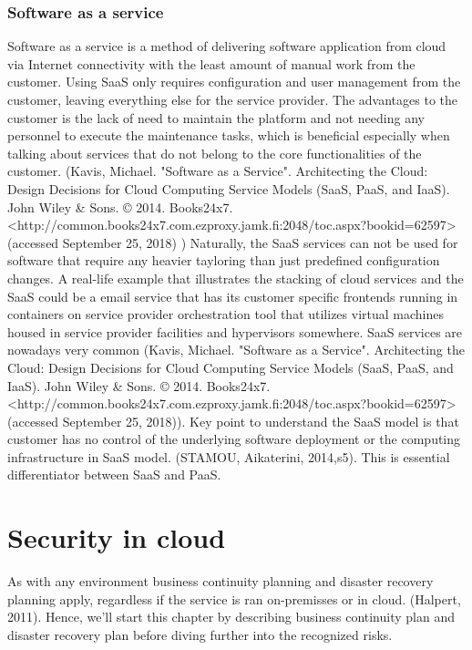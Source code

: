 \documentclass{article}
\begin{document}
\subsubsection{Software as a service}
Software as a service is a method of delivering software application from cloud via Internet connectivity with the least amount of manual work from the customer. Using SaaS only requires configuration and user management from the customer, leaving everything else for the service provider. The advantages to the customer is the lack of need to maintain the platform and not needing any personnel to execute the maintenance tasks, which is beneficial especially when talking about services that do not belong to the core functionalities of the customer. (Kavis, Michael. "Software as a Service". Architecting the Cloud: Design Decisions for Cloud Computing Service Models (SaaS, PaaS, and IaaS). John Wiley \& Sons. © 2014. Books24x7. <http://common.books24x7.com.ezproxy.jamk.fi:2048/toc.aspx?bookid=62597> (accessed September 25, 2018) ) Naturally, the SaaS services can not be used for software that require any heavier tayloring than just predefined configuration changes.
A real-life example that illustrates the stacking of cloud services and the SaaS could be a email service that has its customer specific frontends running in containers on service provider orchestration tool that utilizes virtual machines housed in service provider facilities and hypervisors somewhere. SaaS services are nowadays very common (Kavis, Michael. "Software as a Service". Architecting the Cloud: Design Decisions for Cloud Computing Service Models (SaaS, PaaS, and IaaS). John Wiley \& Sons. © 2014. Books24x7. <http://common.books24x7.com.ezproxy.jamk.fi:2048/toc.aspx?bookid=62597> (accessed September 25, 2018)).
Key point to understand the SaaS model is that customer has no control of the underlying software deployment or the computing infrastructure in SaaS model. (STAMOU, Aikaterini, 2014,s5). This is essential differentiator between SaaS and PaaS.
\section{Security in cloud}
As with any environment business continuity planning and disaster recovery planning apply, regardless if the service is ran on-premisses or in cloud. (Halpert, 2011).
Hence, we'll start this chapter by describing business continuity plan and disaster recovery plan before diving further into the recognized risks.
\end{document}
